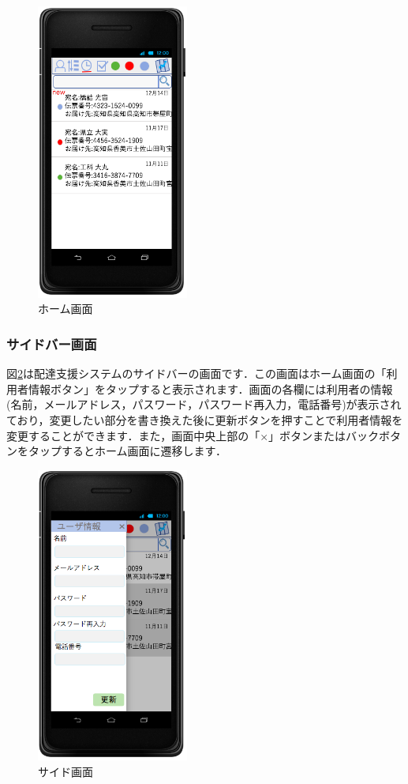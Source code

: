 \documentclass[a4j,titlepage]{jarticle}
\begin{document}
\begin{figure}[H]
 \begin{center}
  \includegraphics[width=50mm]{driver_home.png}
	\caption{ホーム画面}
	\label{fig:driver_home}
 \end{center}

\end{figure}



\newpage
\subsubsection{サイドバー画面}
図\ref{fig:driver_side}は配達支援システムのサイドバーの画面です．この画面はホーム画面の「利用者情報ボタン」をタップすると表示されます．画面の各欄には利用者の情報(名前，メールアドレス，パスワード，パスワード再入力，電話番号)が表示されており，変更したい部分を書き換えた後に更新ボタンを押すことで利用者情報を変更することができます．また，画面中央上部の「×」ボタンまたはバックボタンをタップするとホーム画面に遷移します．

\begin{figure}[H]
 \begin{center}
  \includegraphics[width=50mm]{driver_side.png}
	\caption{サイド画面}
	\label{fig:driver_side}
 \end{center}

\end{figure}
\newpage
\end{document}

